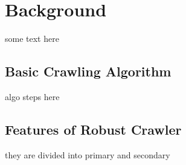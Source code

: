 \chapter{Background}
some text here

\section{Basic Crawling Algorithm}
algo steps here

\section{Features of Robust Crawler}
they are divided into primary and secondary \cite{einstein}

\pagebreak